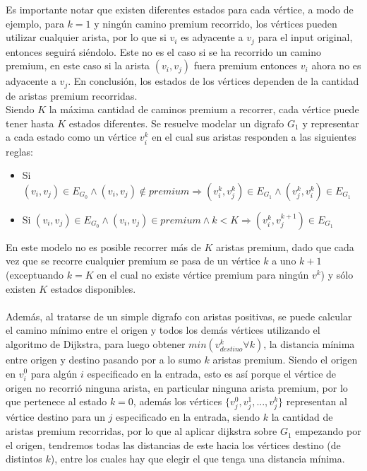 Es importante notar que existen diferentes estados para cada vértice, a modo de ejemplo, para $k=1$ y ningún camino premium recorrido, los vértices pueden utilizar cualquier arista, por lo que si $v_i$ es adyacente a $v_j$ para el input original, entonces seguirá siéndolo. Este no es el caso si se ha recorrido un camino premium, en este caso si la arista $(v_i, v_j)$ fuera premium entonces $v_i$ ahora no es adyacente a $v_j$. En conclusión, los estados de los vértices dependen de la cantidad de aristas premium recorridas.\\

Siendo $K$ la máxima cantidad de caminos premium a recorrer, cada vértice puede tener hasta $K$ estados diferentes. Se resuelve modelar un digrafo $G_1$ y representar a cada estado como un vértice $v_i^k$ en el cual sus aristas responden a las siguientes reglas:
\begin{itemize}
	\item Si $(v_i,v_j) \in E_{G_0} \land (v_i,v_j) \notin premium \Rightarrow (v_i^k,v_j^k) \in E_{G_1} \land (v_j^k,v_i^k) \in E_{G_1}$
	\item Si $(v_i,v_j) \in E_{G_0} \land (v_i,v_j) \in premium \land k < K \Rightarrow (v_i^k,v_j^{k+1}) \in E_{G_1}$
\end{itemize}
En este modelo no es posible recorrer más de $K$ aristas premium, dado que cada vez que se recorre cualquier premium se pasa de un vértice $k$ a uno $k+1$ (exceptuando $k=K$ en el cual no existe vértice premium para ningún $v^k$) y sólo existen $K$ estados disponibles.\\\\
Además, al tratarse de un simple digrafo con aristas positivas, se puede calcular el camino mínimo entre el origen y todos los demás vértices utilizando el algoritmo de Dijkstra, para luego obtener $min(v_{destino}^k \forall k)$, la distancia mínima entre origen y destino pasando por a lo sumo $k$ aristas premium. Siendo el origen en $v_i^0$ para algún $i$ especificado en la entrada, esto es así porque el vértice de origen no recorrió ninguna arista, en particular ninguna arista premium, por lo que pertenece al estado $k=0$, además los vértices $\{v_j^0,v_j^1,...,v_j^k\}$ representan al vértice destino para un $j$ especificado en la entrada, siendo $k$ la cantidad de aristas premium recorridas, por lo que al aplicar dijkstra sobre $G_1$ empezando por el origen, tendremos todas las distancias de este hacia los vértices destino (de distintos $k$), entre los cuales hay que elegir el que tenga una distancia mínima. \\

